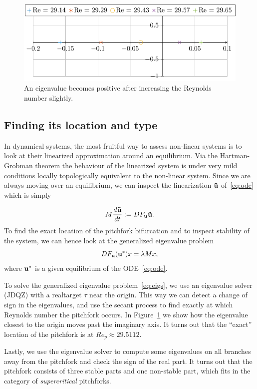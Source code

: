 \begin{figure}[p]
    \includegraphics[width=\textwidth]{images/eigenvalues.pdf}
    \caption{An eigenvalue becomes positive after increasing the Reynolds number slightly.}
    \label{fig:eigenvaluespitch}
\end{figure}

\newpage

\subsection{Finding its location and type}
In dynamical systems, the most fruitful way to assess non-linear systems is to look at their linearized approximation around an equilibrium. Via the Hartman-Grobman theorem the behaviour of the linearized system is under very mild conditions locally topologically equivalent to the non-linear system. Since we are always moving over an equilibrium, we can inspect the linearization $\mathbf{\tilde u}$ of~\eqref{eq:ode} which is simply

\begin{equation}
    M\frac{d \mathbf{\tilde u} }{d t} := DF_{\mathbf{u}}\mathbf{\tilde{u}}.
\end{equation}
To find the exact location of the pitchfork bifurcation and to inspect stability of the system, we can hence look at the generalized eigenvalue problem
\begin{equation}\label{eq:eigs}
    DF_{\mathbf{u}}(\mathbf{u}^*)x = \lambda M x,
\end{equation}
where $\mathbf{u}^*$ is a given equilibrium of the ODE~\eqref{eq:ode}.

To solve the generalized eigenvalue problem~\eqref{eq:eigs}, we use an eigenvalue solver (JDQZ) with a real\footnotemark[1] target $\tau$ near the origin. This way we can detect a change of sign in the eigenvalues, and use the secant process to find exactly at which Reynolds number the pitchfork occurs. In Figure~\ref{fig:eigenvaluespitch} we show how the eigenvalue closest to the origin moves past the imaginary axis. It turns out that the ``exact'' location of the pitchfork is at $Re_p \approx 29.5112$.

Lastly, we use the eigenvalue solver to compute some eigenvalues on all branches away from the pitchfork and check the sign of the real part. It turns out that the pitchfork consists of three stable parts and one non-stable part, which fits in the category of {\em supercritical} pitchforks. 



